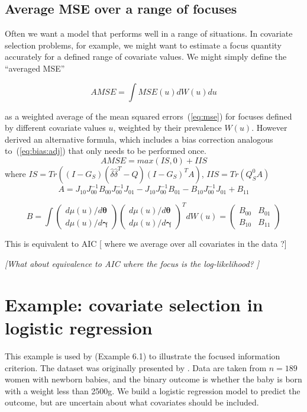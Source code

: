 \documentclass[article,shortnames,nojss,nofooter]{jss}\usepackage[]{graphicx}\usepackage[]{color}
\newcommand{\btheta}{\boldsymbol{\theta}}
\newcommand{\bgamma}{\boldsymbol{\gamma}}
\begin{document}
\subsection{Average MSE over a range of focuses}

Often we want a model that performs well in a range of situations.    In covariate selection problems, for example, we might want to estimate a focus quantity accurately for a defined range of covariate values.   We might simply define the ``averaged MSE'' 

\[ AMSE = \int MSE(u) dW(u) du \] 

as a weighted average of the mean squared errors~(\ref{eq:mse}) for focuses defined by different covariate values $u$, weighted by their prevalence $W(u)$.   However \citet{claeskens:hjort:book} derived an alternative formula, which includes a bias correction analogous to~(\ref{eq:bias:adj}) that only needs to be performed once. 
\begin{equation}
  \label{eq:amse}
  AMSE = max(IS,0) + IIS
\end{equation}
where $IS = Tr((I - G_S)(\hat\delta \hat\delta^T - Q)(I - G_S)^T A)$, $IIS = Tr(Q_S^0 A)$ 
\[ A = J_{10} J_{00}^{-1}B_{00}J_{00}^{-1}J_{01} - J_{10}J_{00}^{-1}B_{01} - B_{10}J_{00}^{-1}J_{01} + B_{11} \] 

\[ 
B = \int 
\left( 
  \begin{array}{l}
  d\mu(u)/d\btheta\\
  d\mu(u)/d\bgamma
\end{array}
\right)
\left( 
\begin{array}{l}
  d\mu(u)/d\btheta\\
  d\mu(u)/d\bgamma
\end{array}
\right)
^T dW(u) = 
\left( 
\begin{array}{ll}
  B_{00} & B_{01}\\
  B_{10} & B_{11}
\end{array}
\right)
\] 

This is equivalent to AIC [ where we average over all covariates in the data ?]

\emph{[What about equivalence to AIC where the focus is the log-likelihood? ]}


\section{Example: covariate selection in logistic regression }


This example is used by \citet{claeskens:hjort:book} (Example 6.1) to illustrate the focused information criterion.  The dataset was originally presented by \citet{hosmer:lemeshow:firstedition}. Data are taken from $n=189$ women with newborn babies, and the binary outcome is whether the baby is born with a weight less than 2500g.   We build a logistic regression model to predict the outcome, but are uncertain about what covariates should be included. 
\end{document}
